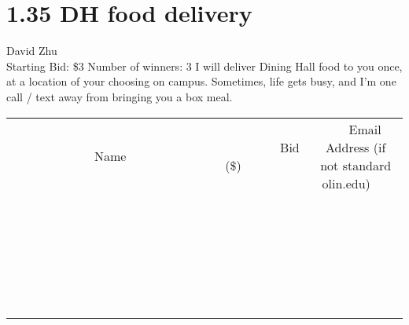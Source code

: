 \documentclass[11pt]{article}
\begin{document}
\section*{1.35 DH food delivery }
David Zhu
\\
Starting Bid: \$3
\newline
Number of winners: 3
\newline
I will deliver Dining Hall food to you once, at a location of your choosing on campus. Sometimes, life gets busy, and I'm one call / text away from bringing you a box meal.
\\[6ex]
\begin{tabular}{c c c}
~~~~~~~~~~~~~Name~~~~~~~~~~~~~ & ~~~~~~~~~Bid (\$)~~~~~~~~~  & ~~~Email Address (if not standard olin.edu)~~~\\
 & & \\
\hline
 & & \\
\hline
 & & \\
\hline
 & & \\
\hline
 & & \\
\hline
 & & \\
\hline
 & & \\
\hline
 & & \\
\hline
 & & \\
\hline
 & & \\
\hline
 & & \\
\hline
 & & \\
\hline
 & & \\
\hline
 & & \\
\hline
 & & \\
\hline
 & & \\
\hline
 & & \\
\hline
 & & \\
\hline
 & & \\
\hline
 & & \\
\hline
 & & \\
\hline
 & & \\
\hline
 & & \\
\hline
 & & \\
\hline
 & & \\
\hline
 & & \\
\hline
\end{tabular}
\newpage
\end{document}

